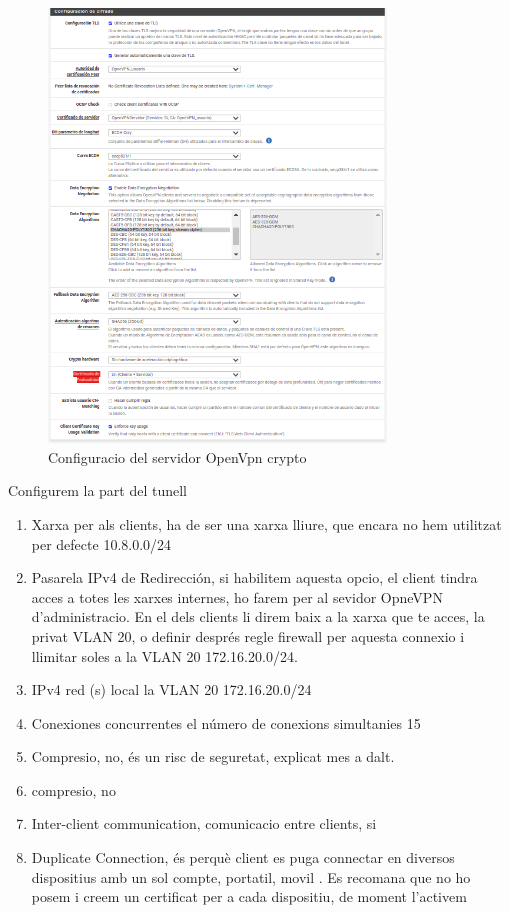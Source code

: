 \documentclass[
  10pt,
]{krantz}
\providecommand{\tightlist}{%
  \setlength{\itemsep}{0pt}\setlength{\parskip}{0pt}}
\begin{document}
\begin{figure}
\centering
\includegraphics[width=0.8\textwidth,height=\textheight]{imatges/proxmox/Conf_vpn_server2.png}
\caption{Configuracio del servidor OpenVpn crypto}
\end{figure}

Configurem la part del tunell

\begin{enumerate}
\def\labelenumi{\arabic{enumi}.}
\tightlist
\item
  Xarxa per als clients, ha de ser una xarxa lliure, que encara no hem utilitzat per defecte 10.8.0.0/24
\item
  Pasarela IPv4 de Redirección, si habilitem aquesta opcio, el client tindra acces a totes les xarxes internes, ho farem per al sevidor OpneVPN d'administracio. En el dels clients li direm baix a la xarxa que te acces, la privat VLAN 20, o definir després regle firewall per aquesta connexio i llimitar soles a la VLAN 20 172.16.20.0/24.
\item
  IPv4 red (s) local la VLAN 20 172.16.20.0/24
\item
  Conexiones concurrentes el número de conexions simultanies 15
\item
  Compresio, no, és un risc de seguretat, explicat mes a dalt.
\item
  compresio, no
\item
  Inter-client communication, comunicacio entre clients, si
\item
  Duplicate Connection, és perquè client es puga connectar en diversos dispositius amb un sol compte, portatil, movil . Es recomana que no ho posem i creem un certificat per a cada dispositiu, de moment l'activem
\end{enumerate}
\end{document}
